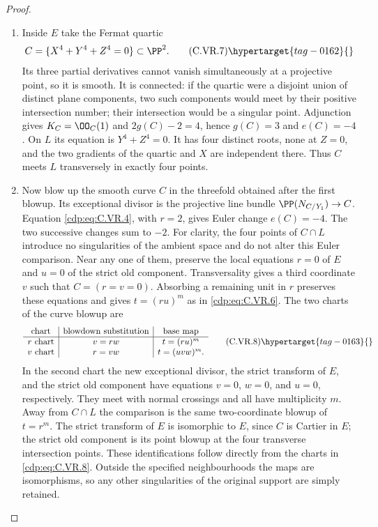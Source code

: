 \begin{proof}
\begin{enumerate}[label={$\langle1\rangle$\arabic*.},leftmargin=*]
\item Inside $E$ take the Fermat quartic
\[
 C=\{X^4+Y^4+Z^4=0\}\subset\PP^2.                \tag{C.VR.7}\hypertarget{tag-0162}{}\label{cdp:eq:C.VR.7}
\]
Its three partial derivatives cannot vanish simultaneously at a
projective point, so it is smooth. It is connected: if the quartic
were a disjoint union of distinct plane components, two such
components would meet by their positive intersection number; their
intersection would be a singular point. Adjunction gives
$K_C=\OO_C(1)$ and $2g(C)-2=4$, hence $g(C)=3$ and $e(C)=-4$.
On $L$ its equation is $Y^4+Z^4=0$. It has four distinct roots,
none at $Z=0$, and the two gradients of the quartic and $X$ are
independent there. Thus $C$ meets $L$ transversely in exactly four
points.

\item Now blow up the smooth curve $C$ in the threefold obtained after the
first blowup. Its exceptional divisor is the projective line bundle
$\PP(N_{C/Y_1})\to C$. Equation \eqref{cdp:eq:C.VR.4}, with $r=2$, gives Euler
change $e(C)=-4$. The two successive changes sum to $-2$.
For clarity, the four points of $C\cap L$ introduce no singularities
of the ambient space and do not alter this Euler comparison. Near any
one of them, preserve the local equations $r=0$ of $E$ and $u=0$ of
the strict old component. Transversality gives a third coordinate $v$
such that $C=(r=v=0)$. Absorbing a remaining unit in $r$ preserves
these equations and gives $t=(ru)^m$ as in \eqref{cdp:eq:C.VR.6}. The two charts of
the curve blowup are
\[
 \begin{array}{c|c|c}
 \text{chart}&\text{blowdown substitution}&\text{base map}\\ \hline
 \text{$r$ chart}&v=rw&t=(ru)^m\\
 \text{$v$ chart}&r=vw&t=(uvw)^m .
 \end{array}                                      \tag{C.VR.8}\hypertarget{tag-0163}{}\label{cdp:eq:C.VR.8}
\]
In the second chart the new exceptional divisor, the strict transform
of $E$, and the strict old component have equations $v=0$, $w=0$,
and $u=0$, respectively. They meet with normal crossings and all
have multiplicity $m$. Away from $C\cap L$ the comparison is the
same two-coordinate blowup of $t=r^m$. The strict transform of $E$
is isomorphic to $E$, since $C$ is Cartier in $E$; the strict old
component is its point blowup at the four transverse intersection
points. These identifications follow directly from the charts in
\eqref{cdp:eq:C.VR.8}. Outside the specified neighbourhoods the maps are
isomorphisms, so any other singularities of the original support
are simply retained.


\end{enumerate}
\end{proof}
